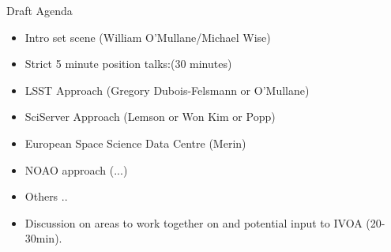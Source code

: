 \documentclass[11pt,twoside]{article}
\begin{document}
Draft Agenda\\
\begin{itemize}
\item Intro set scene (William O'Mullane/Michael Wise)
\item Strict 5 minute position talks:(30 minutes)
\item LSST Approach (Gregory Dubois-Felsmann or O’Mullane)
\item SciServer Approach (Lemson or Won Kim or Popp)
\item European Space Science Data Centre (Merin)
\item NOAO approach (...)
\item Others ..
\item Discussion on areas to work together on and potential input to IVOA (20-30min).
\end{itemize}



\end{document}
